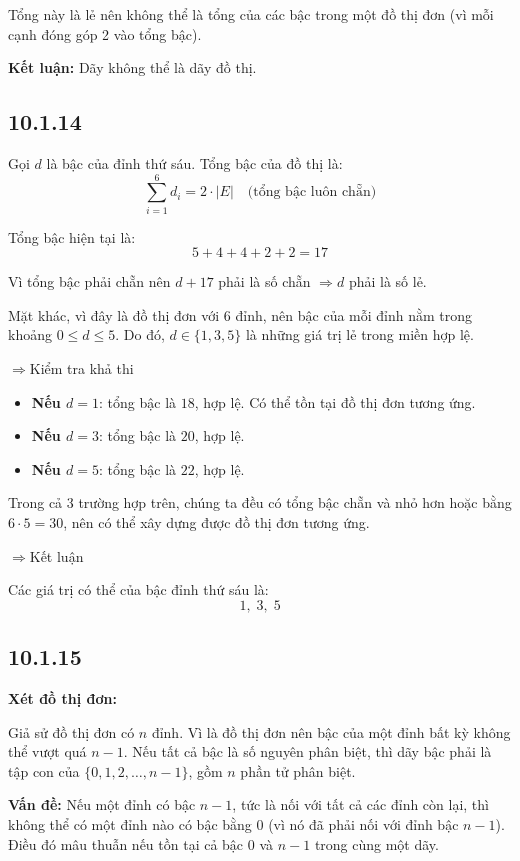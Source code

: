 \documentclass{article}
\begin{document}
	Tổng này là lẻ nên không thể là tổng của các bậc trong một đồ thị đơn (vì mỗi cạnh đóng góp 2 vào tổng bậc).
	
	\textbf{Kết luận:} Dãy không thể là dãy đồ thị.
	
	\subsection*{10.1.14}
	Gọi \( d \) là bậc của đỉnh thứ sáu. Tổng bậc của đồ thị là:
	\[
	\sum_{i=1}^{6} d_i = 2 \cdot |E| \quad \text{(tổng bậc luôn chẵn)}
	\]
	
	Tổng bậc hiện tại là:
	\[
	5 + 4 + 4 + 2 + 2 = 17
	\]
	
	Vì tổng bậc phải chẵn nên \( d + 17 \) phải là số chẵn \( \Rightarrow d \) phải là số lẻ.
	
	Mặt khác, vì đây là đồ thị đơn với 6 đỉnh, nên bậc của mỗi đỉnh nằm trong khoảng \( 0 \le d \le 5 \). Do đó, \( d \in \{1, 3, 5\} \) là những giá trị lẻ trong miền hợp lệ.
	
		$\Rightarrow${Kiểm tra khả thi}
	
	\begin{itemize}
		\item \textbf{Nếu \( d = 1 \)}: tổng bậc là \( 18 \), hợp lệ. Có thể tồn tại đồ thị đơn tương ứng.
		\item \textbf{Nếu \( d = 3 \)}: tổng bậc là \( 20 \), hợp lệ.
		\item \textbf{Nếu \( d = 5 \)}: tổng bậc là \( 22 \), hợp lệ.
	\end{itemize}
	
	Trong cả 3 trường hợp trên, chúng ta đều có tổng bậc chẵn và nhỏ hơn hoặc bằng \( 6 \cdot 5 = 30 \), nên có thể xây dựng được đồ thị đơn tương ứng.
	
		$\Rightarrow${Kết luận}
	
	Các giá trị có thể của bậc đỉnh thứ sáu là:
	\[
	\boxed{1,\; 3,\; 5}
	\]
	
	\subsection*{10.1.15}
	\textbf{Xét đồ thị đơn:}
	
	Giả sử đồ thị đơn có \( n \) đỉnh. Vì là đồ thị đơn nên bậc của một đỉnh bất kỳ không thể vượt quá \( n - 1 \).  
	Nếu tất cả bậc là số nguyên phân biệt, thì dãy bậc phải là tập con của \( \{0, 1, 2, \dots, n-1\} \), gồm \( n \) phần tử phân biệt.
	
	\textbf{Vấn đề:} Nếu một đỉnh có bậc \( n-1 \), tức là nối với tất cả các đỉnh còn lại, thì không thể có một đỉnh nào có bậc bằng 0 (vì nó đã phải nối với đỉnh bậc \( n-1 \)). Điều đó mâu thuẫn nếu tồn tại cả bậc \( 0 \) và \( n-1 \) trong cùng một dãy.
	
\end{document}
